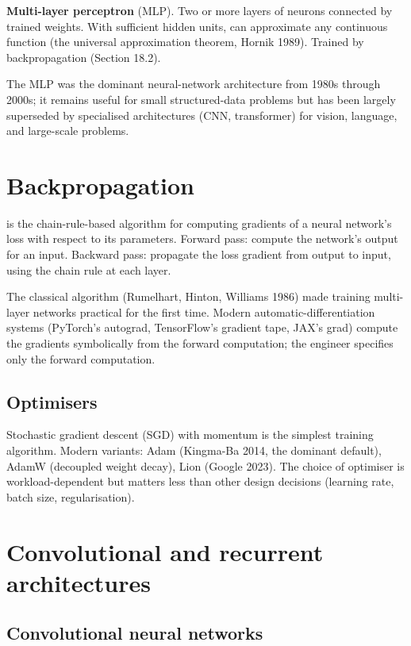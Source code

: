 \textbf{Multi-layer perceptron} (MLP). Two or more layers of neurons connected by trained weights. With sufficient hidden units, can approximate any continuous function (the universal approximation theorem, Hornik 1989). Trained by backpropagation (Section 18.2).

The MLP was the dominant neural-network architecture from 1980s through 2000s; it remains useful for small structured-data problems but has been largely superseded by specialised architectures (CNN, transformer) for vision, language, and large-scale problems.

\section{Backpropagation}

 is the chain-rule-based algorithm for computing gradients of a neural network's loss with respect to its parameters. Forward pass: compute the network's output for an input. Backward pass: propagate the loss gradient from output to input, using the chain rule at each layer.

The classical algorithm (Rumelhart, Hinton, Williams 1986) made training multi-layer networks practical for the first time. Modern automatic-differentiation systems (PyTorch's autograd, TensorFlow's gradient tape, JAX's grad) compute the gradients symbolically from the forward computation; the engineer specifies only the forward computation.

\subsection{Optimisers}

Stochastic gradient descent (SGD) with momentum is the simplest training algorithm. Modern variants: Adam (Kingma-Ba 2014, the dominant default), AdamW (decoupled weight decay), Lion (Google 2023). The choice of optimiser is workload-dependent but matters less than other design decisions (learning rate, batch size, regularisation).

\section{Convolutional and recurrent architectures}

\subsection{Convolutional neural networks}

